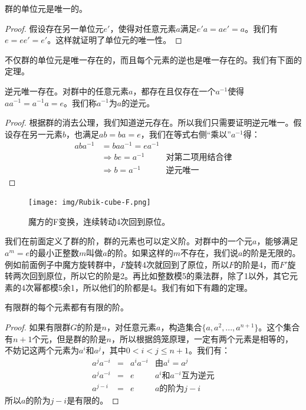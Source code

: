 \documentclass[b5paper]{ctexart}
\begin{document}
\begin{theorem}
群的单位元是唯一的。
\end{theorem}

\begin{proof}
假设存在另一单位元$e'$，使得对任意元素$a$满足$e'a = ae' = a$。我们有$e = ee'= e'$。这样就证明了单位元的唯一性。
\end{proof}

不仅群的单位元是唯一存在的，而且每个元素的逆也是唯一存在的。我们有下面的定理。

\begin{theorem}
逆元唯一存在。对群中的任意元素$a$，都存在且仅存在一个$a^{-1}$使得$aa^{-1} = a^{-1}a = e$。我们称$a^{-1}$为$a$的逆元。
\end{theorem}

\begin{proof}
根据群的消去公理，我们知道逆元存在。所以我们只需要证明逆元唯一。假设存在另一元素$b$，也满足$ab = ba = e$，我们在等式右侧“乘以”$a^{-1}$得：
\[
\begin{array}{rll}
aba^{-1} & = baa^{-1} = ea^{-1} & \\
& \Rightarrow be = a^{-1} & \text{对第二项用结合律} \\
& \Rightarrow b = a^{-1} & \text{逆元唯一}
\end{array}
\]
\end{proof}

\begin{figure}[htbp]
 \centering
 \texttt{[image: img/Rubik-cube-F.png]}
 \caption{魔方的F变换，连续转动4次回到原位。}
 \label{fig:Rubik-cube-F}
\end{figure}

我们在前面定义了群的阶，群的元素也可以定义阶。对群中的一个元$a$，能够满足$a^m = e$的最小正整数$m$叫做$a$的阶。如果这样的$m$不存在，我们说$a$的阶是无限的。例如前面例子中魔方旋转群中，$F$旋转4次就回到了原位，所以$F$的阶是4，而$F'$旋转两次回到原位，所以它的阶是2。再比如整数模5的乘法群，除了1以外，其它元素的4次幂都模5余1，所以他们的阶都是4。我们有如下有趣的定理。

\begin{theorem}
有限群的每个元素都有有限的阶。
\end{theorem}

\begin{proof}
如果有限群$G$的阶是$n$，对任意元素$a$，构造集合$\{a, a^2, ..., a^{n+1}\}$。这个集合有$n+1$个元，但是群的阶是$n$，所以根据鸽笼原理，一定有两个元素是相等的， 不妨记这两个元素为$a^i$和$a^j$，其中$0 < i < j \leq n + 1$。我们有：
\[
\begin{array}{rcll}
a^ja^{-i} & = & a^{i}a^{-i} & \text{由} a^i = a^j \\
a^ja^{-i} & = & e & \text{$a^i$和$a^{-i}$互为逆元} \\
a^{j-i} & = & e & a\text{的阶为} j - i
\end{array}
\]
所以$a$的阶为$j-i$是有限的。
\end{proof}
\end{document}
